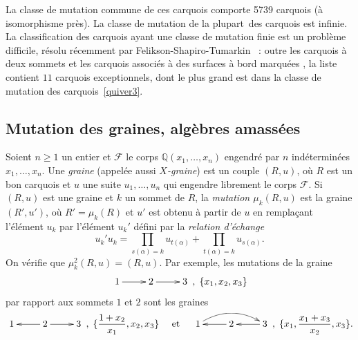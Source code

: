 \documentclass[brochure,12pt]{bourbaki}
\newcommand{\og}{\guillemotleft\hspace*{1pt}}
\newcommand{\fg}{\hspace*{1pt}\guillemotright}
\newcommand{\ko}{\: , \;}
\numberwithin{equation}{subsection}
\numberwithin{theorem}{section}
\newcommand{\Q}{\mathbb{Q}}
\newcommand{\cF}{{\mathcal F}}
\begin{document}
La classe de mutation commune de ces carquois comporte 5739 carquois (\`a
isomorphisme pr\`es). La classe de mutation de la \og plupart\fg\ des
carquois est infinie.  La classification des carquois ayant une
classe de mutation finie est un probl\`eme difficile, r\'esolu
r\'ecemment par Felikson-Shapiro-Tumarkin
\cite{FeliksonShapiroTumarkin08}~: outre les carquois \`a deux
sommets et les carquois associ\'es \`a des surfaces \`a bord
marqu\'ees \cite{FominShapiroThurston08}, la liste contient $11$
carquois exceptionnels, dont le plus grand est dans la classe de
mutation des carquois~\ref{quiver3}.

\subsection{Mutation des graines, alg\`ebres amass\'ees}
Soient $n\geq 1$ un entier et $\cF$ le corps $\Q(x_1, \ldots, x_n)$
engendr\'e par $n$ ind\'etermin\'ees $x_1, \ldots, x_n$.
Une {\em graine} (appel\'ee aussi {\em $X$-graine}) est un couple $(R,u)$,
o\`u $R$ est un bon carquois et $u$ une suite $u_1, \ldots, u_n$ qui engendre
librement le corps $\cF$. Si $(R,u)$ est une graine et
$k$ un sommet de $R$, la {\em mutation $\mu_k(R,u)$} est
la graine $(R',u')$, o\`u $R'=\mu_k(R)$ et $u'$ est
obtenu \`a partir de $u$ en rempla\c{c}ant l'\'el\'ement
$u_k$ par l'\'el\'ement $u_k'$ d\'efini par la
{\em relation d'\'echange}
\begin{equation} \label{eq:echange}
u_k' u_k= \prod_{s(\alpha)=k} u_{t(\alpha)} + \prod_{t(\alpha)=k} u_{s(\alpha)} .
\end{equation}
On v\'erifie que $\mu_k^2(R,u)=(R,u)$. Par exemple, les mutations de la graine
\[
\xymatrix{1 \ar[r] & 2 \ar[r] & 3} \ko \{x_1, x_2, x_3\}
\]
par rapport aux sommets $1$ et $2$ sont les graines
\begin{equation} \label{eq:seeds-for-A3}
\xymatrix{1 & 2 \ar[l] \ar[r] & 3} \ko \{\frac{1+x_2}{x_1}, x_2, x_3\}
\quad\mbox{ et }\quad
\xymatrix{1 \ar@/^1pc/[rr] & 2 \ar[l] & 3 \ar[l]} \ko \{ x_1, \frac{x_1+x_3}{x_2}, x_3\}.
\end{equation}
\end{document}
